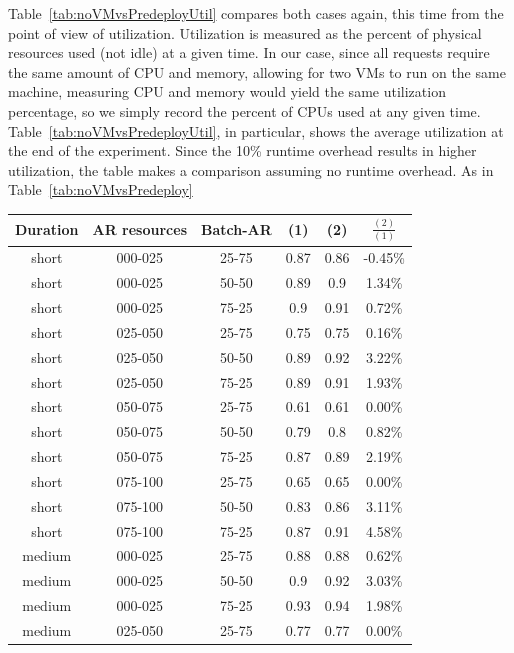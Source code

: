 Table~\ref{tab:noVMvsPredeployUtil} compares both cases again, this time from the point of view of utilization. Utilization is measured as the percent of physical resources used (not idle) at a given time. In our case, since all requests require the same amount of CPU and memory, allowing for two VMs to run on the same machine, measuring CPU and memory would yield the same utilization percentage, so we simply record the percent of CPUs used at any given time. Table~\ref{tab:noVMvsPredeployUtil}, in particular, shows the average utilization at the end of the experiment. Since the 10\% runtime overhead results in higher utilization, the table makes a comparison assuming no runtime overhead. As in Table~\ref{tab:noVMvsPredeploy}

\begin{table}
\begin{center}
\begin{tabular}{|c|c|c|c|c|c|}
\hline
\textbf{Duration} & \textbf{AR resources} & \textbf{Batch-AR} & \textbf{(1)} & \textbf{(2)} & \textbf{$\frac{(2)}{(1)}$}
\\\hline
short & 000-025 & 25-75 & 0.87 & 0.86 & -0.45\%
\\\hline
short & 000-025 & 50-50 & 0.89 & 0.9 & 1.34\%
\\\hline
short & 000-025 & 75-25 & 0.9 & 0.91 & 0.72\%
\\\hline
short & 025-050 & 25-75 & 0.75 & 0.75 & 0.16\%
\\\hline
short & 025-050 & 50-50 & 0.89 & 0.92 & 3.22\%
\\\hline
short & 025-050 & 75-25 & 0.89 & 0.91 & 1.93\%
\\\hline
short & 050-075 & 25-75 & 0.61 & 0.61 & 0.00\%
\\\hline
short & 050-075 & 50-50 & 0.79 & 0.8 & 0.82\%
\\\hline
short & 050-075 & 75-25 & 0.87 & 0.89 & 2.19\%
\\\hline
short & 075-100 & 25-75 & 0.65 & 0.65 & 0.00\%
\\\hline
short & 075-100 & 50-50 & 0.83 & 0.86 & 3.11\%
\\\hline
short & 075-100 & 75-25 & 0.87 & 0.91 & 4.58\%
\\\hline
medium & 000-025 & 25-75 & 0.88 & 0.88 & 0.62\%
\\\hline
medium & 000-025 & 50-50 & 0.9 & 0.92 & 3.03\%
\\\hline
medium & 000-025 & 75-25 & 0.93 & 0.94 & 1.98\%
\\\hline
medium & 025-050 & 25-75 & 0.77 & 0.77 & 0.00\%

\end{tabular}
\end{center}
\end{table}
